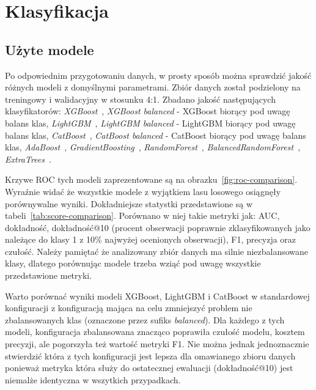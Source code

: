 \documentclass[a4paper,12pt]{article}
\begin{document}
    \section{Klasyfikacja}

    \subsection{Użyte modele}
    Po odpowiednim przygotowaniu danych, w prosty sposób można sprawdzić jakość różnych modeli z domyślnymi parametrami.
    Zbiór danych został podzielony na treningowy i walidacyjny w stosunku 4:1.
    Zbadano jakość następujących klasyfikatorów: \textit{XGBoost}~\cite{xgboost}, \textit{XGBoost balanced} - XGBoost biorący pod uwagę balans klas, \textit{LightGBM}~\cite{lightgbm}, \textit{LightGBM balanced} - LightGBM biorący pod uwagę balans klas, \textit{CatBoost}~\cite{catboost}, \textit{CatBoost balanced} - CatBoost biorący pod uwagę balans klas, \textit{AdaBoost}~\cite{adaboost}, \textit{GradientBoosting}~\cite{gradient-boosting}, \textit{RandomForest}~\cite{random-forest}, \textit{BalancedRandomForest}~\cite{balanced-random-forest}, \textit{ExtraTrees}~\cite{extra-trees}.

    Krzywe ROC tych modeli zaprezentowane są na obrazku~\ref{fig:roc-comparison}.
    Wyraźnie widać że wszystkie modele z wyjątkiem lasu losowego osiągnęły porównywalne wyniki.
    Dokładniejsze statystki przedstawione są w tabeli~\ref{tab:score-comparison}.
    Porównano w niej takie metryki jak: AUC, dokładność, dokładność@10 (procent obserwacji poprawnie zklasyfikowanych jako należące do klasy 1 z 10\% najwyżej ocenionych obserwacji), F1, precyzja oraz czułość.
    Należy pamiętać że analizowany zbiór danych ma silnie niezbalansowane klasy, dlatego porównując modele trzeba wziąć pod uwagę wszystkie przedstawione metryki.

    Warto porównać wyniki modeli XGBoost, LightGBM i CatBoost w standardowej konfiguracji z konfiguracją mająca na celu zmniejszyć problem nie zbalansowanych klas (oznaczone przez sufiks \textit{balanced}).
    Dla każdego z tych modeli, konfiguracja zbalansowana znacząco poprawiła czułość modelu, kosztem precyzji, ale pogorszyła też wartość metryki F1.
    Nie można jednak jednoznacznie stwierdzić która z tych konfiguracji jest lepsza dla omawianego zbioru danych ponieważ metryka która służy do ostatecznej ewaluacji (dokładność@10) jest niemalże identyczna w wszytkich przypadkach.
\end{document}
